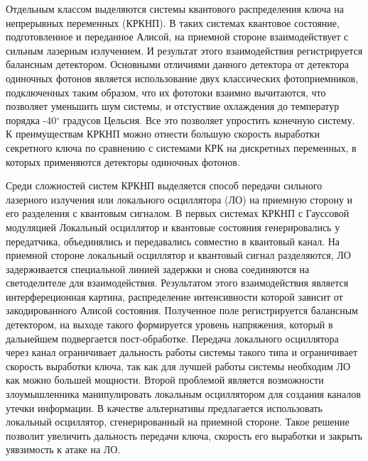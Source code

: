 Отдельным классом выделяются системы квантового распределения ключа на непрерывных переменных (КРКНП). В таких системах квантовое состояние, подготовленное и переданное Алисой, на приемной стороне взаимодействует с сильным лазерным излучением. И результат этого взаимодействия регистрируется балансным детектором. Основными отличиями данного детектора от детектора одиночных фотонов является использование двух классических фотоприемников, подключенных таким образом, что их фототоки взаимно вычитаются, что позволяет уменьшить шум системы,  и отстуствие охлаждения до температур порядка -40$^{\circ}$  градусов Цельсия. Все это позволяет упростить конечную систему. К преимуществам КРКНП можно отнести большую скорость выработки секретного ключа по сравнению с системами КРК на дискретных переменных, в которых применяются детекторы одиночных фотонов. 

Среди сложностей систем КРКНП выделяется способ передачи сильного лазерного излучения или локального осциллятора (ЛО) на приемную сторону и его разделения с квантовым сигналом. В первых системах КРКНП с Гауссовой модуляцией Локальный осциллятор и квантовые состояния  генерировались у передатчика, объединялись и передавались совместно в квантовый канал. На приемной стороне локальный осциллятор и квантовый сигнал разделяются, ЛО задерживается специальной линией задержки и снова соединяются на светоделителе для взаимодействия. Результатом этого взаимодействия является интерфереционная картина, распределение интенсивности которой зависит от закодированного Алисой состояния. Полученное поле регистрируется балансным детектором, на выходе такого формируется уровень напряжения, который в дальнейшем подвергается пост-обработке.  Передача локального осциллятора через канал ограничивает дальность работы системы такого типа и ограничивает скорость выработки ключа, так как для лучшей работы системы необходим ЛО как можно большей мощности. Второй проблемой является возможности злоумышленника манипулировать локальным осциллятором для создания каналов утечки информации. В качестве альтернативы предлагается использовать локальный осциллятор, сгенерированный на приемной стороне. Такое решение позволит увеличить дальность передачи ключа, скорость его выработки и закрыть уявзимость к атаке на ЛО.


